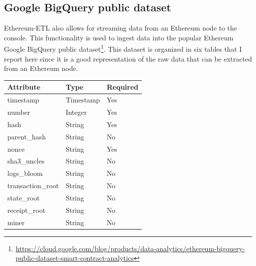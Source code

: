 \subsection{Google BigQuery public dataset}

\noindent Ethereum-ETL also allows for streaming data from an Ethereum node to the console. This functionality is used to ingest data into the popular Ethereum Google BigQuery public dataset\footnote{\url{https://cloud.google.com/blog/products/data-analytics/ethereum-bigquery-public-dataset-smart-contract-analytics}}. This dataset is organized in six tables that I report here since it is a good representation of the raw data that can be extracted from an Ethereum node.

\begin{table}[H]
\centering
    \begin{tabular}  { m{6cm} m{3cm} m{3cm} } 
    \toprule
    \textbf{Attribute} & \textbf{Type} & \textbf{Required} \\
    \midrule
    timestamp & Timestamp & Yes\\ %
    number & Integer & Yes\\ %
    hash & String & Yes\\ %
    parent\_hash & String & No\\ %
    nonce & String & Yes\\ %
    sha3\_uncles & String & No\\ %
    logs\_bloom & String & No\\ %
    transaction\_root & String & No\\ %
    state\_root& String & No\\ %
    receipt\_root & String & No\\ %
    miner & String & No\\ %

\end{tabular}
\end{table}
